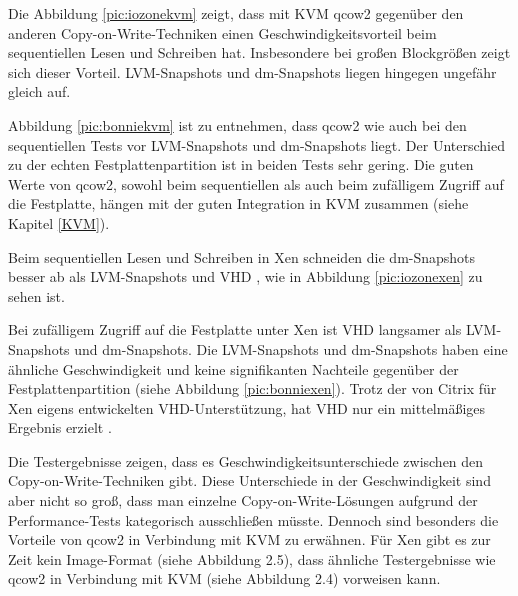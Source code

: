 \begin{comment} Bei dem Iozone-Test wurden Dateigrößen von 512 MB, 2 GB, 4 Gb und 8 GB verwendet. Für die Entscheidungsfindung wird jedoch nur der Test mit 8 GB Dateigröße herangezogen. \end{comment}

Die Abbildung \ref{pic:iozonekvm} zeigt, dass mit KVM qcow2 gegenüber den anderen Copy-on-Write-Techniken einen Geschwindigkeitsvorteil beim sequentiellen Lesen und Schreiben hat. Insbesondere bei großen Blockgrößen zeigt sich dieser Vorteil. LVM-Snapshots und dm-Snapshots liegen hingegen ungefähr gleich auf.

Abbildung \ref{pic:bonniekvm} ist zu entnehmen, dass qcow2 wie auch bei den sequentiellen Tests vor LVM-Snapshots und dm-Snapshots liegt. Der Unterschied zu der echten Festplattenpartition ist in beiden Tests sehr gering. Die guten Werte von qcow2, sowohl beim sequentiellen als auch beim zufälligem Zugriff auf die Festplatte, hängen mit der guten Integration in KVM zusammen (siehe Kapitel \ref{KVM}).

Beim sequentiellen Lesen und Schreiben in Xen schneiden die dm-Snapshots besser ab als LVM-Snapshots und VHD , wie in Abbildung \ref{pic:iozonexen} zu sehen ist. 

Bei zufälligem Zugriff auf die Festplatte unter Xen ist VHD langsamer als LVM-Snapshots und dm-Snapshots. Die LVM-Snapshots und dm-Snapshots haben eine ähnliche Geschwindigkeit und keine signifikanten Nachteile gegenüber der Festplattenpartition (siehe Abbildung \ref{pic:bonniexen}). Trotz der von Citrix für Xen eigens entwickelten VHD-Unterstützung, hat VHD nur ein mittelmäßiges Ergebnis erzielt \cite{citrixVHD}. 

Die Testergebnisse zeigen, dass es Geschwindigkeitsunterschiede zwischen den Copy-on-Write-Techniken gibt. Diese Unterschiede in der Geschwindigkeit sind aber nicht so groß, dass man einzelne Copy-on-Write-Lösungen aufgrund der Performance-Tests kategorisch ausschließen müsste. Dennoch sind besonders die Vorteile von qcow2 in Verbindung mit KVM zu erwähnen. Für Xen gibt es zur Zeit kein Image-Format (siehe Abbildung 2.5), dass ähnliche Testergebnisse wie qcow2 in Verbindung mit KVM (siehe Abbildung 2.4) vorweisen kann. 


